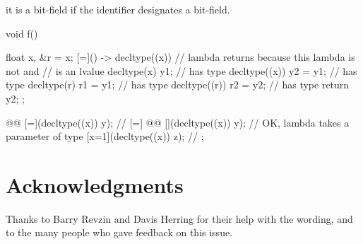 \documentclass{wg21}
\begin{document}
it is a bit-field if the identifier designates a bit-field.
\begin{example}
\begin{codeblock}
    void f() {
        float x, &r = x;
        [=]() -> decltype((x)) {      // lambda returns  because this lambda is not  and
            //  is an lvalue
            decltype(x) y1;             //  has type 
            decltype((x)) y2 = y1;      //  has type 
            decltype(r) r1 = y1;        //  has type 
            decltype((r)) r2 = y2;      //  has type 
            return y2;
        };

        @@
        [=](decltype((x)) y){};       // 
        [=]{
            @@
            [](decltype((x)) y){};    // OK, lambda takes a parameter of type 
            [x=1](decltype((x)) z){}; // 
        };
    }
\end{codeblock}
\end{example}

\section{Acknowledgments}

Thanks to Barry Revzin and Davis Herring for their help with the wording, and to the many people who gave feedback on this
issue.




\end{document}
